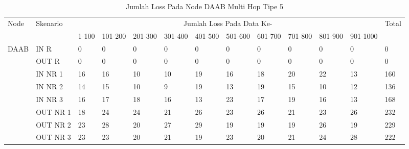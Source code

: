 \begin{table}[H]
  \centering
  \caption{Jumlah Loss Pada Node DAAB Multi Hop Tipe 5}
    \begin{tabular}{|p{1cm}|p{1.9cm}|p{0.6cm}|p{0.6cm}|p{0.6cm}|p{0.6cm}|p{0.6cm}|p{0.6cm}|p{0.6cm}|p{0.6cm}|p{0.6cm}|p{0.6cm}|p{1cm}|}
    \hline
        \multirow{2}{*}{Node}&\multirow{2}{*}{Skenario}&\multicolumn{10}{|c|}{Jumlah Loss Pada Data Ke-}&\multirow{2}{*}{Total} \\\cline{3-12}
          & & 1-100 & 101-200 & 201-300 & 301-400 & 401-500 & 501-600 & 601-700 & 701-800 & 801-900 & 901-1000 & \\
        \hline
    \multirow{8}{*}{DAAB}  
          & IN R  & 0     & 0     & 0     & 0     & 0     & 0     & 0     & 0     & 0     & 0     & 0 \\
          & OUT R & 0     & 0     & 0     & 0     & 0     & 0     & 0     & 0     & 0     & 0     & 0 \\
          & IN NR 1 & 16    & 16    & 10    & 10    & 19    & 16    & 18    & 20    & 22    & 13    & 160 \\
          & IN NR 2 & 14    & 15    & 10    & 9     & 19    & 13    & 19    & 15    & 10    & 12    & 136 \\
          & IN NR 3 & 16    & 17    & 18    & 16    & 13    & 23    & 17    & 19    & 16    & 13    & 168 \\
          & OUT NR 1 & 18    & 24    & 24    & 21    & 26    & 23    & 26    & 21    & 23    & 26    & 232 \\
          & OUT NR 2 & 23    & 28    & 20    & 27    & 29    & 19    & 19    & 19    & 26    & 19    & 229 \\
          & OUT NR 3 & 23    & 23    & 20    & 21    & 19    & 23    & 20    & 21    & 24    & 28    & 222 \\
    \hline
    \end{tabular}%
  \label{tab:addlabel}%
\end{table}%

